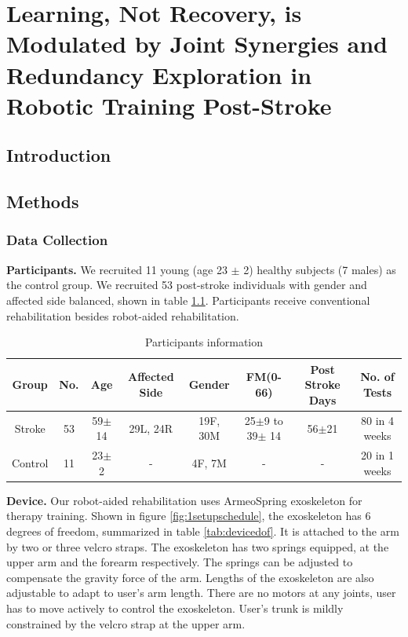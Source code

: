 \chapter{Learning, Not Recovery, is Modulated by Joint Synergies and Redundancy Exploration in Robotic Training Post-Stroke}
\label{cha:armeospring}



\section{Introduction}



\section{Methods}

\subsection{Data Collection}

\textbf{Participants.} 
We recruited 11 young (age 23 $\pm$ 2) healthy subjects (7 males) as the control group.
We recruited 53 post-stroke individuals with gender and affected side balanced, shown in table \ref{tab:demog}. 
Participants receive conventional rehabilitation besides robot-aided rehabilitation.

\begin{table}[b]
	\begin{tabular}{c c c c c c c c}
		\hline
		Group & No. & Age & Affected Side & Gender & FM(0-66) & Post Stroke Days & No. of Tests\\
		\hline
		Stroke & 53 & 59$\pm$14 & 29L, 24R & 19F, 30M & 25$\pm$9 to 39$\pm$ 14 & 56$\pm$21 & 80 in 4 weeks \\ 
		Control & 11 & 23$\pm$2 & - & 4F, 7M & - & - & 20 in 1 weeks \\
		\hline
	\end{tabular}
	\caption{Participants information}
	\label{tab:demog}
\end{table}

\textbf{Device.}
Our robot-aided rehabilitation uses ArmeoSpring exoskeleton \cite{} for therapy training. 
Shown in figure \ref{fig:1setupschedule}, the exoskeleton has 6 degrees of freedom, summarized in table \ref{tab:devicedof}. 
It is attached to the arm by two or three velcro straps. 
The exoskeleton has two springs equipped, at the upper arm and the forearm respectively. 
The springs can be adjusted to compensate the gravity force of the arm. 
Lengths of the exoskeleton are also adjustable to adapt to user's arm length.
There are no motors at any joints, user has to move actively to control the exoskeleton. 
User's trunk is mildly constrained by the velcro strap at the upper arm.


